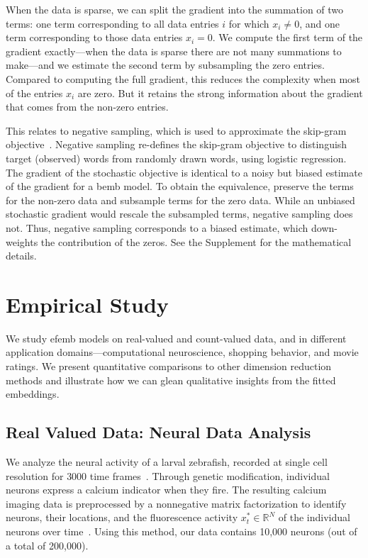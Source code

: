 \documentclass[12pt]{article}
\begin{document}

When the data is sparse, we can split the gradient into the summation of
two terms: one term corresponding to all data entries $i$ for which
$x_i\neq 0$, and one term corresponding to those data entries $x_i=0$.
We compute the first term of the gradient exactly---when the data is
sparse there are not many summations to make---and we estimate the second term 
by subsampling the zero entries.  Compared to computing
the full gradient, this reduces the complexity when most of the
entries $x_{i}$ are zero.  But it retains the strong information
about the gradient that comes from the non-zero entries.

This relates to negative sampling, which is used to approximate the
skip-gram objective~\citep{mikolov2013distributed}.  Negative sampling
re-defines the skip-gram objective to distinguish target (observed)
words from randomly drawn words, using logistic regression. The
gradient of the stochastic objective is identical to a noisy but
biased estimate of the gradient for a \gls{bemb} model.  To
obtain the equivalence, preserve the terms for the non-zero data and
subsample terms for the zero data.  While an unbiased stochastic
gradient would rescale the subsampled terms, negative sampling does
not.  Thus, negative sampling corresponds to a biased estimate,
which down-weights the contribution of the zeros. See the Supplement
for the mathematical details.

\section{Empirical Study}
\label{sec:experiments}
\glsresetall

We study \gls{efemb} models on real-valued and count-valued data, and
in different application domains---computational neuroscience,
shopping behavior, and movie ratings.  We present quantitative
comparisons to other dimension reduction methods and illustrate how we
can glean qualitative insights from the fitted embeddings.

\subsection{Real Valued Data: Neural Data Analysis}

  We analyze the neural activity of a larval zebrafish,
recorded at single cell resolution for $3000$ time
frames~\citep{ahrens2013whole}.  Through genetic modification,
individual neurons express a calcium indicator when they fire.  The
resulting calcium imaging data is preprocessed by a nonnegative matrix
factorization to identify neurons, their locations, and the
fluorescence activity $x^*_t \in \mathbb{R}^N$ of the individual
neurons over time~\citep{friedrich2015fast}.  Using this method, our
data contains 10,000 neurons (out of a total of 200,000).
\end{document}
